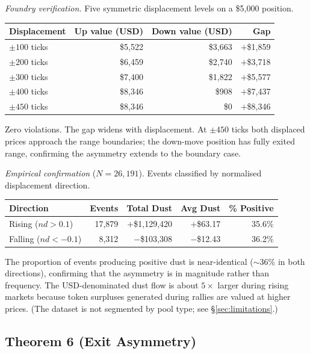 \documentclass[11pt,a4paper]{article}
\theoremstyle{definition}
\begin{document}
\medskip
\noindent\textit{Foundry verification.} Five symmetric displacement levels on a \$5,000 position.

\begin{table}[H]
\centering
\begin{tabular}{@{}lrrr@{}}
\toprule
Displacement & Up value (USD) & Down value (USD) & Gap \\
\midrule
$\pm 100$ ticks & \$5,522 & \$3,663 & $+$\$1,859 \\
$\pm 200$ ticks & \$6,459 & \$2,740 & $+$\$3,718 \\
$\pm 300$ ticks & \$7,400 & \$1,822 & $+$\$5,577 \\
$\pm 400$ ticks & \$8,346 & \$908 & $+$\$7,437 \\
$\pm 450$ ticks & \$8,346 & \$0 & $+$\$8,346 \\
\bottomrule
\end{tabular}
\end{table}

\noindent Zero violations. The gap widens with displacement. At $\pm 450$ ticks both displaced prices approach the range boundaries; the down-move position has fully exited range, confirming the asymmetry extends to the boundary case.

\medskip
\noindent\textit{Empirical confirmation} ($N = 26{,}191$). Events classified by normalised displacement direction.

\begin{table}[H]
\centering
\begin{tabular}{@{}lrrrr@{}}
\toprule
Direction & Events & Total Dust & Avg Dust & \% Positive \\
\midrule
Rising ($nd > 0.1$) & 17,879 & $+$\$1,129,420 & $+$\$63.17 & 35.6\% \\
Falling ($nd < -0.1$) & 8,312 & $-$\$103,308 & $-$\$12.43 & 36.2\% \\
\bottomrule
\end{tabular}
\end{table}

\noindent The proportion of events producing positive dust is near-identical (${\sim}36\%$ in both directions), confirming that the asymmetry is in magnitude rather than frequency. The USD-denominated dust flow is about $5\times$ larger during rising markets because token surpluses generated during rallies are valued at higher prices. (The dataset is not segmented by pool type; see \S\ref{sec:limitations}.)

\subsection{Theorem 6 (Exit Asymmetry)}
\end{document}
